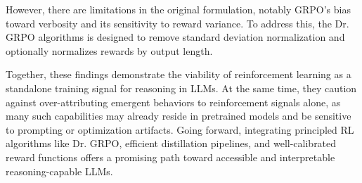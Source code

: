 \documentclass{article} %
\begin{document}
However, there are limitations in the original formulation, notably GRPO’s bias toward verbosity and its sensitivity to reward variance. To address this, the Dr. GRPO algorithms is designed to remove standard deviation normalization and optionally normalizes rewards by output length. 

Together, these findings demonstrate the viability of reinforcement learning as a standalone training signal for reasoning in LLMs. At the same time, they caution against over-attributing emergent behaviors to reinforcement signals alone, as many such capabilities may already reside in pretrained models and be sensitive to prompting or optimization artifacts. Going forward, integrating principled RL algorithms like Dr. GRPO, efficient distillation pipelines, and well-calibrated reward functions offers a promising path toward accessible and interpretable reasoning-capable LLMs.




\end{document}
